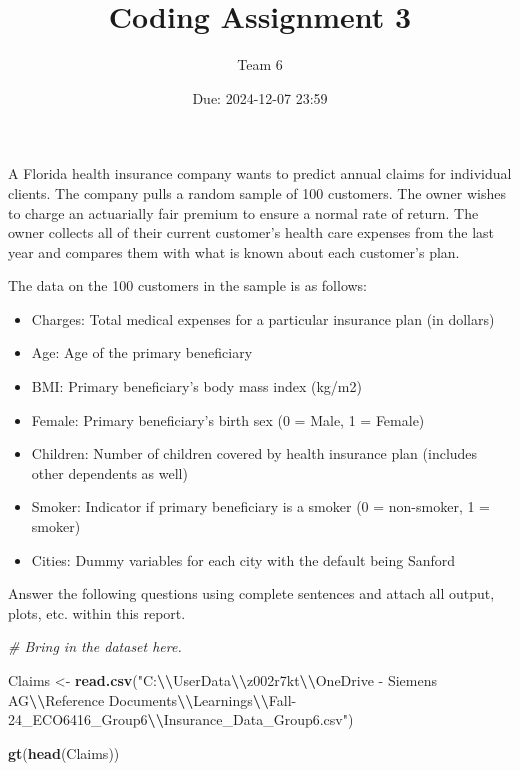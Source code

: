\documentclass[
]{article}
\title{Coding Assignment 3}
\author{Team 6}
\date{Due: 2024-12-07 23:59}
\newenvironment{Shaded}{\begin{snugshade}}{\end{snugshade}}
\newcommand{\CommentTok}[1]{\textcolor[rgb]{0.56,0.35,0.01}{\textit{#1}}}
\newcommand{\FunctionTok}[1]{\textcolor[rgb]{0.13,0.29,0.53}{\textbf{#1}}}
\newcommand{\NormalTok}[1]{#1}
\newcommand{\OtherTok}[1]{\textcolor[rgb]{0.56,0.35,0.01}{#1}}
\newcommand{\SpecialCharTok}[1]{\textcolor[rgb]{0.81,0.36,0.00}{\textbf{#1}}}
\newcommand{\StringTok}[1]{\textcolor[rgb]{0.31,0.60,0.02}{#1}}
\providecommand{\tightlist}{%
  \setlength{\itemsep}{0pt}\setlength{\parskip}{0pt}}
\begin{document}
\maketitle

{
\setcounter{tocdepth}{2}
\tableofcontents
}
A Florida health insurance company wants to predict annual claims for
individual clients. The company pulls a random sample of 100 customers.
The owner wishes to charge an actuarially fair premium to ensure a
normal rate of return. The owner collects all of their current
customer's health care expenses from the last year and compares them
with what is known about each customer's plan.

The data on the 100 customers in the sample is as follows:

\begin{itemize}
\tightlist
\item
  Charges: Total medical expenses for a particular insurance plan (in
  dollars)
\item
  Age: Age of the primary beneficiary
\item
  BMI: Primary beneficiary's body mass index (kg/m2)
\item
  Female: Primary beneficiary's birth sex (0 = Male, 1 = Female)
\item
  Children: Number of children covered by health insurance plan
  (includes other dependents as well)
\item
  Smoker: Indicator if primary beneficiary is a smoker (0 = non-smoker,
  1 = smoker)
\item
  Cities: Dummy variables for each city with the default being Sanford
\end{itemize}

Answer the following questions using complete sentences and attach all
output, plots, etc. within this report.

\begin{Shaded}
\begin{Highlighting}[]
\CommentTok{\# Bring in the dataset here.}

\NormalTok{Claims }\OtherTok{\textless{}{-}} \FunctionTok{read.csv}\NormalTok{(}\StringTok{"C:}\SpecialCharTok{\textbackslash{}\textbackslash{}}\StringTok{UserData}\SpecialCharTok{\textbackslash{}\textbackslash{}}\StringTok{z002r7kt}\SpecialCharTok{\textbackslash{}\textbackslash{}}\StringTok{OneDrive {-} Siemens AG}\SpecialCharTok{\textbackslash{}\textbackslash{}}\StringTok{Reference Documents}\SpecialCharTok{\textbackslash{}\textbackslash{}}\StringTok{Learnings}\SpecialCharTok{\textbackslash{}\textbackslash{}}\StringTok{Fall{-}24\_ECO6416\_Group6}\SpecialCharTok{\textbackslash{}\textbackslash{}}\StringTok{Insurance\_Data\_Group6.csv"}\NormalTok{)}


\FunctionTok{gt}\NormalTok{(}\FunctionTok{head}\NormalTok{(Claims))}
\end{Highlighting}
\end{Shaded}
\end{document}
